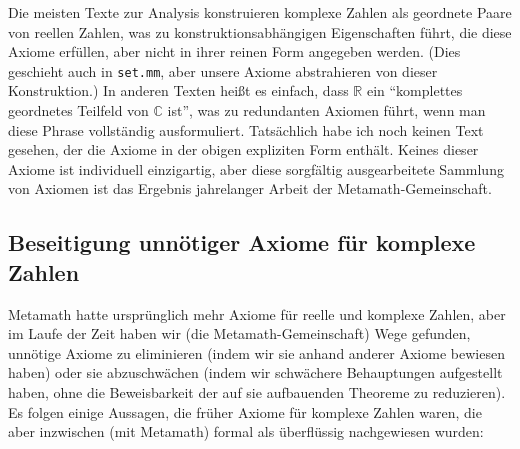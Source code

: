 Die meisten Texte zur Analysis konstruieren komplexe Zahlen als geordnete Paare von reellen Zahlen, was zu konstruktionsabhängigen Eigenschaften führt, die diese Axiome erfüllen, aber nicht in ihrer reinen Form angegeben werden.  (Dies geschieht auch in \texttt{set.mm}, aber unsere Axiome abstrahieren von dieser Konstruktion.) In anderen Texten heißt es einfach, dass $\mathbb{R}$ ein "`komplettes geordnetes Teilfeld von $\mathbb{C}$ ist"', was zu redundanten Axiomen führt, wenn man diese Phrase vollständig ausformuliert.  Tatsächlich habe ich noch keinen Text gesehen, der die Axiome in der obigen expliziten Form enthält. Keines dieser Axiome ist individuell einzigartig, aber diese sorgfältig ausgearbeitete Sammlung von Axiomen ist das Ergebnis jahrelanger Arbeit der Metamath-Gemeinschaft.

\subsection{Beseitigung unnötiger Axiome für komplexe \\Zahlen}

Metamath hatte ursprünglich mehr Axiome für reelle und komplexe Zahlen, aber im Laufe der Zeit haben wir (die Metamath-Gemeinschaft) Wege gefunden, unnötige Axiome zu eliminieren (indem wir sie anhand anderer Axiome bewiesen haben) oder sie abzuschwächen (indem wir schwächere Behauptungen aufgestellt haben, ohne die Beweisbarkeit der auf sie aufbauenden Theoreme zu reduzieren). Es folgen einige Aussagen, die früher Axiome für komplexe Zahlen waren, die aber inzwischen (mit Metamath) formal als überflüssig nachgewiesen wurden:

